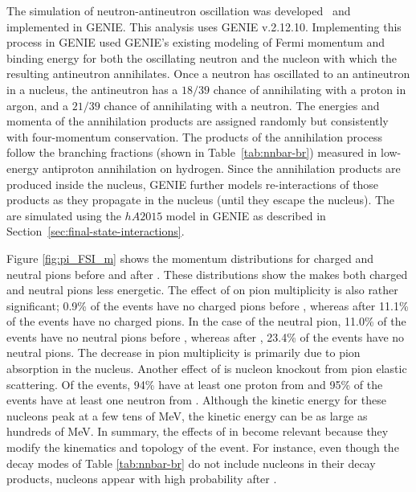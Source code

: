 The simulation of neutron-antineutron oscillation was developed~\cite{Hewes:2017xtr} and implemented in GENIE. This analysis uses GENIE v.2.12.10.
Implementing this process in GENIE used GENIE's existing modeling of Fermi momentum and binding energy for both the oscillating neutron and the nucleon with which the resulting antineutron annihilates.   Once a neutron has oscillated to an antineutron in a nucleus, the antineutron has a $18/39$ chance of annihilating with a proton in argon, and a $21/39$ chance of annihilating with a neutron. The energies and momenta of the annihilation products are assigned randomly but consistently with four-momentum conservation. The products of the annihilation process follow the branching fractions (shown in Table~\ref{tab:nnbar-br}) measured in low-energy antiproton annihilation on hydrogen.
Since the annihilation products are produced inside the nucleus, GENIE further models re-interactions of those products as they propagate in the nucleus (until they escape the nucleus).  The  are simulated using the $hA2015$ model in GENIE as described in Section~\ref{sec:final-state-interactions}.

Figure \ref{fig:pi_FSI_m} shows the momentum distributions for charged and neutral pions before  and after . These distributions show the  makes both charged and neutral pions less energetic.  The effect of  on pion multiplicity is also rather significant; \num{0.9}\% of the events have no charged pions before , whereas after  \num{11.1}\% of the events have no charged pions. In the case of the neutral pion, \num{11.0}\% of the events have no neutral pions before , whereas after , \num{23.4}\% of the events have no neutral pions. The decrease in pion multiplicity is primarily due to pion absorption in the nucleus. Another effect of  is nucleon knockout from pion elastic scattering. Of the events, \num{94}\% have at least one proton from  and \num{95}\% of the events have at least one neutron from . Although the kinetic energy for these nucleons peak at a few tens of \si{\MeV}, the kinetic energy can be as large as hundreds of \si{\MeV}.  In summary, the effects of  in \nnbar become relevant because they modify the kinematics and topology of the event. For instance, even though the decay modes of Table \ref{tab:nnbar-br} do not include nucleons in their decay products, nucleons appear with high probability after .

